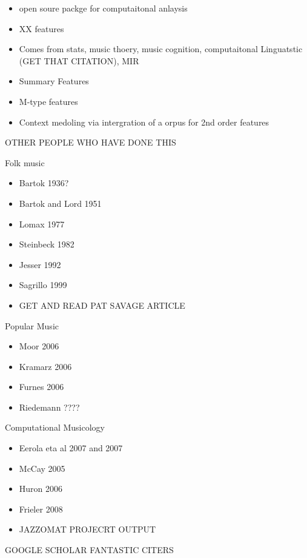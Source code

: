 \documentclass[]{book}
\providecommand{\tightlist}{%
  \setlength{\itemsep}{0pt}\setlength{\parskip}{0pt}}
\theoremstyle{definition}
\theoremstyle{definition}
\theoremstyle{definition}
\theoremstyle{remark}
\begin{document}
\begin{itemize}
\tightlist
\item
  open soure packge for computaitonal anlaysis
\item
  XX features
\item
  Comes from stats, music thoery, music cognition, computaitonal
  Linguatstic (GET THAT CITATION), MIR
\item
  Summary Features
\item
  M-type features
\item
  Context medoling via intergration of a orpus for 2nd order features
\end{itemize}

OTHER PEOPLE WHO HAVE DONE THIS

Folk music

\begin{itemize}
\item
  Bartok 1936?
\item
  Bartok and Lord 1951
\item
  Lomax 1977
\item
  Steinbeck 1982
\item
  Jesser 1992
\item
  Sagrillo 1999
\item
  GET AND READ PAT SAVAGE ARTICLE
\end{itemize}

Popular Music

\begin{itemize}
\tightlist
\item
  Moor 2006
\item
  Kramarz 2006
\item
  Furnes 2006
\item
  Riedemann ????
\end{itemize}

Computational Musicology

\begin{itemize}
\tightlist
\item
  Eerola eta al 2007 and 2007
\item
  McCay 2005
\item
  Huron 2006
\item
  Frieler 2008
\item
  JAZZOMAT PROJECRT OUTPUT
\end{itemize}

GOOGLE SCHOLAR FANTASTIC CITERS
\end{document}

